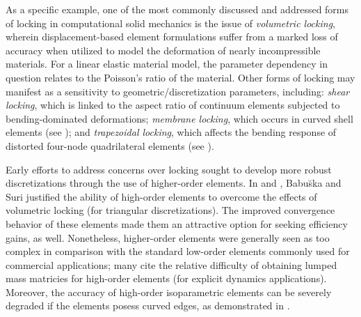 		As a specific example, one of the most commonly discussed and addressed forms of locking in computational solid mechanics is the issue of \textit{volumetric locking}, wherein displacement-based element formulations suffer from a marked loss of accuracy when utilized to model the deformation of nearly incompressible materials. For a linear elastic material model, the parameter dependency in question relates to the Poisson's ratio of the material. Other forms of locking may manifest as a sensitivity to geometric/discretization parameters, including: \textit{shear locking}, which is linked to the aspect ratio of continuum elements subjected to bending-dominated deformations; \textit{membrane locking}, which occurs in curved shell elements (see \cite{Winkler:10}); and \textit{trapezoidal locking}, which affects the bending response of distorted four-node quadrilateral elements (see \cite{MacNeal:87}).
	
		
		Early efforts to address concerns over locking sought to develop more robust discretizations through the use of higher-order elements. In \cite{Babuska&Suri:92:2} and \cite{Suri:91}, Babu\u{s}ka and Suri justified the ability of high-order elements to overcome the effects of volumetric locking (for triangular discretizations). The improved convergence behavior of these elements made them an attractive option for seeking efficiency gains, as well. Nonetheless, higher-order elements were generally seen as too complex in comparison with the standard low-order elements commonly used for commercial applications; many cite the relative difficulty of obtaining lumped mass matricies for high-order elements (for explicit dynamics applications). Moreover, the accuracy of high-order isoparametric elements can be severely degraded if the elements posess curved edges, as demonstrated in \cite{Lee&Bathe:93}.
			
